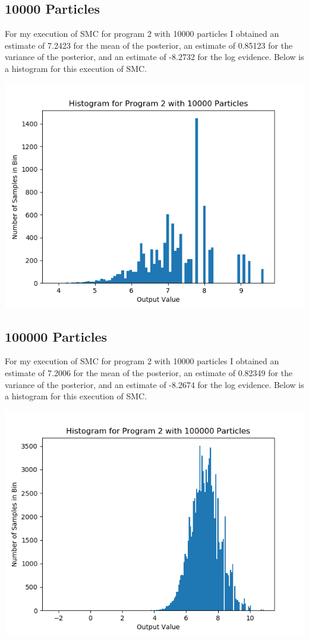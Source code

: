\documentclass[11pt]{article}
\theoremstyle{definition}
\begin{document}
\subsection{10000 Particles}

For my execution of SMC for program 2 with 10000 particles I obtained an estimate of 7.2423 for the mean of the posterior, an estimate of 0.85123 for the variance of the posterior, and an estimate of -8.2732 for the log evidence. Below is a histogram for this execution of SMC.

\begin{center}
\includegraphics[scale=0.5]{../plots/P2NP10000.png}
\end{center}

\subsection{100000 Particles}

For my execution of SMC for program 2 with 10000 particles I obtained an estimate of 7.2006 for the mean of the posterior, an estimate of 0.82349 for the variance of the posterior, and an estimate of  -8.2674 for the log evidence. Below is a histogram for this execution of SMC.

\begin{center}
\includegraphics[scale=0.5]{../plots/P2NP100000.png}
\end{center}
\end{document}
